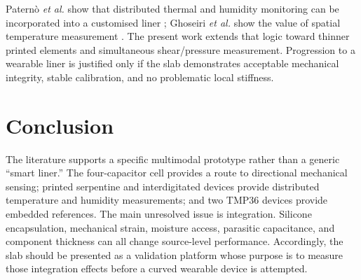 \documentclass[10pt,twocolumn]{article}
\begin{document}
Paternò \textit{et al.} show that distributed thermal and humidity monitoring
can be incorporated into a customised liner \cite{paterno2020}; Ghoseiri
\textit{et al.} show the value of spatial temperature measurement
\cite{ghoseiri2018}. The present work extends that logic toward thinner printed
elements and simultaneous shear/pressure measurement. Progression to a
wearable liner is justified only if the slab demonstrates acceptable
mechanical integrity, stable calibration, and no problematic local stiffness.

\section{Conclusion}

The literature supports a specific multimodal prototype rather than a generic
``smart liner.'' The four-capacitor cell provides a route to directional
mechanical sensing; printed serpentine and interdigitated devices provide
distributed temperature and humidity measurements; and two TMP36 devices
provide embedded references. The main unresolved issue is integration.
Silicone encapsulation, mechanical strain, moisture access, parasitic
capacitance, and component thickness can all change source-level performance.
Accordingly, the slab should be presented as a validation platform whose
purpose is to measure those integration effects before a curved wearable
device is attempted.
\end{document}
